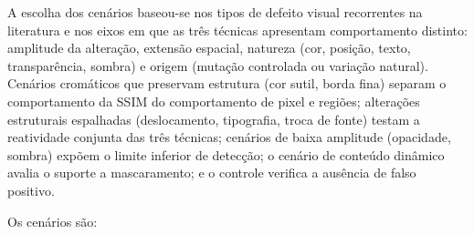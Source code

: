 \documentclass{UNESC}
\begin{document}
A escolha dos cenários baseou-se nos tipos de defeito visual recorrentes na literatura \cite{tanno2020,figueiredo2018,heinonen2020} e nos eixos em que as três técnicas apresentam comportamento distinto: amplitude da alteração, extensão espacial, natureza (cor, posição, texto, transparência, sombra) e origem (mutação controlada ou variação natural). Cenários cromáticos que preservam estrutura (cor sutil, borda fina) separam o comportamento da SSIM do comportamento de pixel e regiões; alterações estruturais espalhadas (deslocamento, tipografia, troca de fonte) testam a reatividade conjunta das três técnicas; cenários de baixa amplitude (opacidade, sombra) expõem o limite inferior de detecção; o cenário de conteúdo dinâmico avalia o suporte a mascaramento; e o controle verifica a ausência de falso positivo.

Os cenários são:
\end{document}
